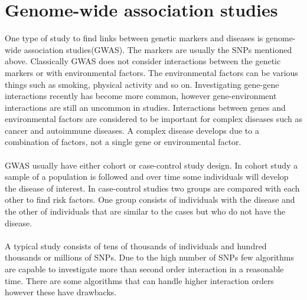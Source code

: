 \documentclass[10pt,a4paper]{report}
\begin{document}
\section{Genome-wide association studies}
One type of study to find links between genetic markers and diseases is genome-wide association studies(GWAS). The markers are usually the SNPs mentioned above. Classically GWAS does not consider interactions between the genetic markers or with environmental factors. The environmental factors can be various things such as smoking, physical activity and so on.  Investigating gene-gene interactions recently has become more common\cite{cordell_detect_review}, however gene-environment interactions are still an uncommon in studies\cite{gene_enviroment_2013}. Interactions between genes and environmental factors are considered to be important for complex diseases such as cancer and autoimmune diseases\cite{cordell_detect_review, gene_enviroment_2013, geira, ra_smoking}. A complex disease develops due to a combination of factors, not a single gene or environmental factor\cite{rothman1998modern}.\\
\\
GWAS usually have either cohort or case-control study design. In cohort study a sample of a population is followed and over time some individuals will develop the disease of interest. In case-control studies two groups are compared with each other to find risk factors. One group consists of individuals with the disease and the other of individuals that are similar to the cases but who do not have the disease.\cite{rothman1998modern,mann_observational}\\
\\
A typical study consists of tens of thousands of individuals and hundred thousands or millions of SNPs. Due to the high number of SNPs few algorithms are capable to investigate more than second order interaction in a reasonable time. There are some algorithms that can handle higher interaction orders however these have drawbacks\cite{gwis,high_order_2012,fast_high_order_cluster}.
\end{document}
